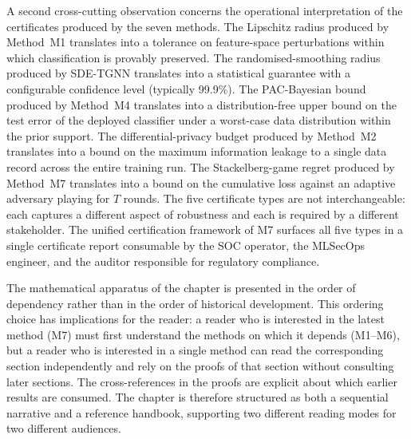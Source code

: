 A second cross-cutting observation concerns the operational interpretation of the certificates produced by the seven methods. The Lipschitz radius produced by Method~M1 translates into a tolerance on feature-space perturbations within which classification is provably preserved. The randomised-smoothing radius produced by SDE-TGNN translates into a statistical guarantee with a configurable confidence level (typically 99.9\%). The PAC-Bayesian bound produced by Method~M4 translates into a distribution-free upper bound on the test error of the deployed classifier under a worst-case data distribution within the prior support. The differential-privacy budget produced by Method~M2 translates into a bound on the maximum information leakage to a single data record across the entire training run. The Stackelberg-game regret produced by Method~M7 translates into a bound on the cumulative loss against an adaptive adversary playing for $T$ rounds. The five certificate types are not interchangeable: each captures a different aspect of robustness and each is required by a different stakeholder. The unified certification framework of M7 surfaces all five types in a single certificate report consumable by the SOC operator, the MLSecOps engineer, and the auditor responsible for regulatory compliance.

The mathematical apparatus of the chapter is presented in the order of dependency rather than in the order of historical development. This ordering choice has implications for the reader: a reader who is interested in the latest method (M7) must first understand the methods on which it depends (M1--M6), but a reader who is interested in a single method can read the corresponding section independently and rely on the proofs of that section without consulting later sections. The cross-references in the proofs are explicit about which earlier results are consumed. The chapter is therefore structured as both a sequential narrative and a reference handbook, supporting two different reading modes for two different audiences.

